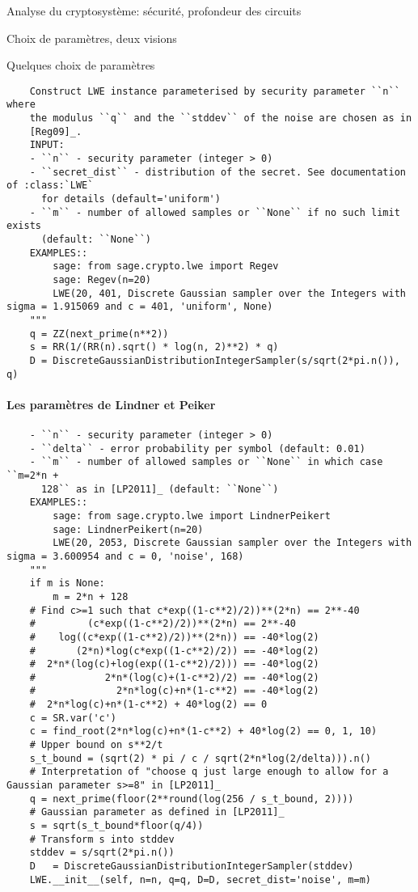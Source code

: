 \begin{section}{Analyse du cryptosystème: sécurité, profondeur des circuits}
\begin{subsection}{Choix de paramètres, deux visions}
\begin{subsubsection}{Quelques choix de paramètres}
	\begin{lstlisting}
	Construct LWE instance parameterised by security parameter ``n`` where
	the modulus ``q`` and the ``stddev`` of the noise are chosen as in
	[Reg09]_.
	INPUT:
	- ``n`` - security parameter (integer > 0)
	- ``secret_dist`` - distribution of the secret. See documentation of :class:`LWE`
	  for details (default='uniform')
	- ``m`` - number of allowed samples or ``None`` if no such limit exists
	  (default: ``None``)
	EXAMPLES::
	    sage: from sage.crypto.lwe import Regev
	    sage: Regev(n=20)
	    LWE(20, 401, Discrete Gaussian sampler over the Integers with sigma = 1.915069 and c = 401, 'uniform', None)
	"""
	q = ZZ(next_prime(n**2))
	s = RR(1/(RR(n).sqrt() * log(n, 2)**2) * q)
	D = DiscreteGaussianDistributionIntegerSampler(s/sqrt(2*pi.n()), q)
	\end{lstlisting}

	\paragraph{}
	\textbf{Les paramètres de Lindner et Peiker}

	\paragraph{}
	\cite{LinPei10a}
	\begin{lstlisting}
	- ``n`` - security parameter (integer > 0)
	- ``delta`` - error probability per symbol (default: 0.01)
	- ``m`` - number of allowed samples or ``None`` in which case ``m=2*n +
	  128`` as in [LP2011]_ (default: ``None``)
	EXAMPLES::
	    sage: from sage.crypto.lwe import LindnerPeikert
	    sage: LindnerPeikert(n=20)
	    LWE(20, 2053, Discrete Gaussian sampler over the Integers with sigma = 3.600954 and c = 0, 'noise', 168)
	"""
	if m is None:
	    m = 2*n + 128
	# Find c>=1 such that c*exp((1-c**2)/2))**(2*n) == 2**-40
	#         (c*exp((1-c**2)/2))**(2*n) == 2**-40
	#    log((c*exp((1-c**2)/2))**(2*n)) == -40*log(2)
	#       (2*n)*log(c*exp((1-c**2)/2)) == -40*log(2)
	#  2*n*(log(c)+log(exp((1-c**2)/2))) == -40*log(2)
	#            2*n*(log(c)+(1-c**2)/2) == -40*log(2)
	#              2*n*log(c)+n*(1-c**2) == -40*log(2)
	#  2*n*log(c)+n*(1-c**2) + 40*log(2) == 0
	c = SR.var('c')
	c = find_root(2*n*log(c)+n*(1-c**2) + 40*log(2) == 0, 1, 10)
	# Upper bound on s**2/t
	s_t_bound = (sqrt(2) * pi / c / sqrt(2*n*log(2/delta))).n()
	# Interpretation of "choose q just large enough to allow for a Gaussian parameter s>=8" in [LP2011]_
	q = next_prime(floor(2**round(log(256 / s_t_bound, 2))))
	# Gaussian parameter as defined in [LP2011]_
	s = sqrt(s_t_bound*floor(q/4))
	# Transform s into stddev
	stddev = s/sqrt(2*pi.n())
	D   = DiscreteGaussianDistributionIntegerSampler(stddev)
	LWE.__init__(self, n=n, q=q, D=D, secret_dist='noise', m=m)
	\end{lstlisting}
	\end{subsubsection}


\end{subsection}
\end{section}
